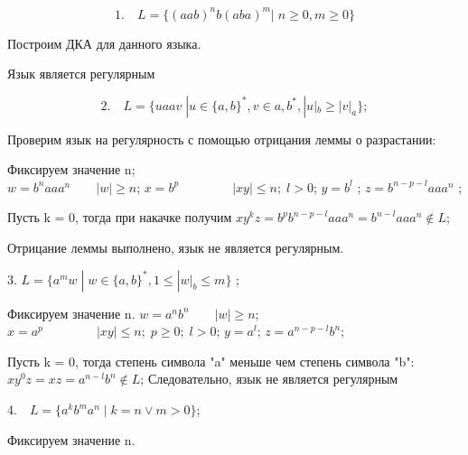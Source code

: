 \documentclass[fleqn]{article}
\begin{document}
\begin{equation}
1. \quad L = \{(aab)^nb(aba)^m | \; n \geq 0, m \geq 0 \}    \nonumber
\end{equation}

Построим  ДКА для данного языка.
 

Язык является регулярным
 
\begin{equation}
2. \quad L = \{ uaav \; |u \in \{a,b\}^* , v \in a,b^* , |u|_b \geq |v|_a \} ;
\end{equation}
 
Проверим язык на регулярность с помощью отрицания леммы о разрастании:
 
Фиксируем значение n;\\
$w = b^naaa^n \qquad |w| \geq n$;
$x = b^p  \qquad\qquad \ |xy| \leq n  ;\; l > 0$;
$y = b^l$ ;
$z = b^{n-p-l}aaa^n$ ;

Пусть k = 0, тогда при накачке получим
$xy^kz = b^pb^{n-p-l}aaa^n = b^{n-l}aaa^n \notin L$;

Отрицание леммы выполнено, язык не является регулярным.
 

3.  $L = \{ a^m w \; | \; w \in \{a,b\}^* , 1 \leq |w|_b \leq m\}$  ;

Фиксируем значение n.
$w = a^n b^n  \qquad |w| \geq n $;
$x = a^p  \qquad\qquad \ |xy| \leq n  ; \; p \geq 0 ;\; l > 0 $;
$y = a^l $;
$z = a^{n-p-l}b^n $;

Пусть k = 0, тогда степень символа "a" меньше чем степень символа "b":
$xy^0z  = xz = a^{n-l}b^n \notin L $;
Следовательно, язык не является регулярным

4.$ \quad L = \{ a^kb^ma^n \; | \; k = n \vee m > 0\}$;

Фиксируем значение n.
 
\end{document}
